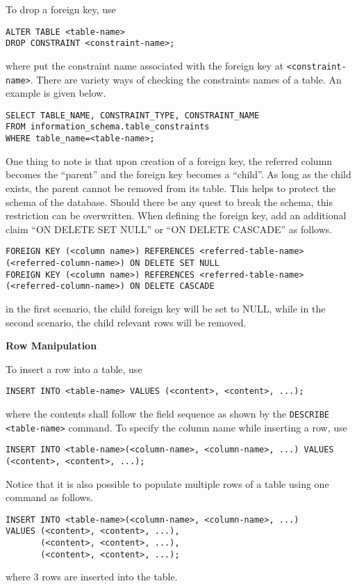 To drop a foreign key, use
\begin{lstlisting}
ALTER TABLE <table-name>
DROP CONSTRAINT <constraint-name>;
\end{lstlisting}
where put the constraint name associated with the foreign key at \verb|<constraint-name>|. There are variety ways of checking the constraints names of a table. An example is given below.
\begin{lstlisting}
SELECT TABLE_NAME, CONSTRAINT_TYPE, CONSTRAINT_NAME
FROM information_schema.table_constraints
WHERE table_name=<table-name>;
\end{lstlisting}

One thing to note is that upon creation of a foreign key, the referred column becomes the ``parent'' and the foreign key becomes a ``child''. As long as the child exists, the parent cannot be removed from its table. This helps to protect the schema of the database. Should there be any quest to break the schema, this restriction can be overwritten. When defining the foreign key, add an additional claim ``ON DELETE SET NULL'' or ``ON DELETE CASCADE'' as follows.
\begin{lstlisting}
FOREIGN KEY (<column name>) REFERENCES <referred-table-name>(<referred-column-name>) ON DELETE SET NULL
FOREIGN KEY (<column name>) REFERENCES <referred-table-name>(<referred-column-name>) ON DELETE CASCADE
\end{lstlisting}
in the first scenario, the child foreign key will be set to NULL, while in the second scenario, the child relevant rows will be removed.

\vspace{0.1in}
\noindent \textbf{Row Manipulation}
\vspace{0.1in}

To insert a row into a table, use
\begin{lstlisting}
INSERT INTO <table-name> VALUES (<content>, <content>, ...);
\end{lstlisting}
where the contents shall follow the field sequence as shown by the \verb|DESCRIBE <table-name>| command. To specify the column name while inserting a row, use
\begin{lstlisting}
INSERT INTO <table-name>(<column-name>, <column-name>, ...) VALUES (<content>, <content>, ...);
\end{lstlisting}
Notice that it is also possible to populate multiple rows of a table using one command as follows.
\begin{lstlisting}
INSERT INTO <table-name>(<column-name>, <column-name>, ...)
VALUES (<content>, <content>, ...),
       (<content>, <content>, ...),
       (<content>, <content>, ...);
\end{lstlisting}
where 3 rows are inserted into the table.

